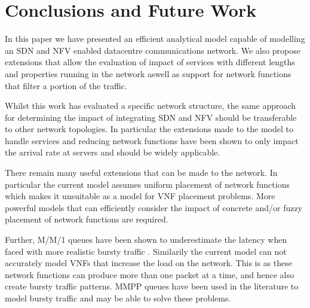 
\section{Conclusions and Future Work}
\label{sec:conclusions}
In this paper we have presented an efficient analytical model capable of modelling an SDN and NFV enabled datacentre communications network. We also propose extensions that allow the evaluation of impact of services with different lengths and properties running in the network aswell as support for network functions that filter a portion of the traffic. 

Whilst this work has evaluated a specific network structure, the same approach for determining the impact of integrating SDN and NFV should be transferable to other network topologies. In particular the extensions made to the model to handle services and reducing network functions have been shown to only impact the arrival rate at servers and should be widely applicable.

There remain many useful extensions that can be made to the network. In particular the current model assumes uniform placement of network functions which makes it unsuitable as a model for VNF placement problems. More powerful models that can efficiently consider the impact of concrete and/or fuzzy placement of network functions are required.

Further, M/M/1 queues have been shown to underestimate the latency when faced with more realistic bursty traffic \cite{WuMLJ12}. Similarily the current model can not accurately model VNFs that increase the load on the network. This is as these network functions can produce more than one packet at a time, and hence also create bursty traffic patterns. MMPP queues have been used in the literature to model bursty traffic \cite{MiaoMWWH16, WuMLJ12} and may be able to solve these problems.
